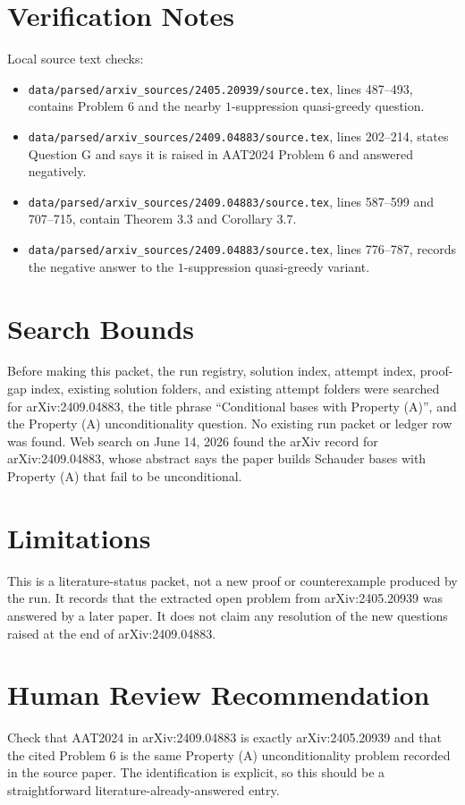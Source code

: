 \documentclass[11pt]{article}
\begin{document}
\section*{Verification Notes}

Local source text checks:
\begin{itemize}
\item \texttt{data/parsed/arxiv\_sources/2405.20939/source.tex}, lines
487--493, contains Problem 6 and the nearby \(1\)-suppression quasi-greedy
question.
\item \texttt{data/parsed/arxiv\_sources/2409.04883/source.tex}, lines
202--214, states Question G and says it is raised in AAT2024 Problem 6 and
answered negatively.
\item \texttt{data/parsed/arxiv\_sources/2409.04883/source.tex}, lines
587--599 and 707--715, contain Theorem 3.3 and Corollary 3.7.
\item \texttt{data/parsed/arxiv\_sources/2409.04883/source.tex}, lines
776--787, records the negative answer to the \(1\)-suppression quasi-greedy
variant.
\end{itemize}

\section*{Search Bounds}

Before making this packet, the run registry, solution index, attempt index,
proof-gap index, existing solution folders, and existing attempt folders were
searched for arXiv:2409.04883, the title phrase ``Conditional bases with
Property (A)'', and the Property (A) unconditionality question. No existing run
packet or ledger row was found. Web search on June 14, 2026 found the arXiv
record for arXiv:2409.04883, whose abstract says the paper builds Schauder
bases with Property (A) that fail to be unconditional.

\section*{Limitations}

This is a literature-status packet, not a new proof or counterexample produced
by the run. It records that the extracted open problem from arXiv:2405.20939
was answered by a later paper. It does not claim any resolution of the new
questions raised at the end of arXiv:2409.04883.

\section*{Human Review Recommendation}

Check that AAT2024 in arXiv:2409.04883 is exactly arXiv:2405.20939 and that
the cited Problem 6 is the same Property (A) unconditionality problem recorded
in the source paper. The identification is explicit, so this should be a
straightforward literature-already-answered entry.
\end{document}
